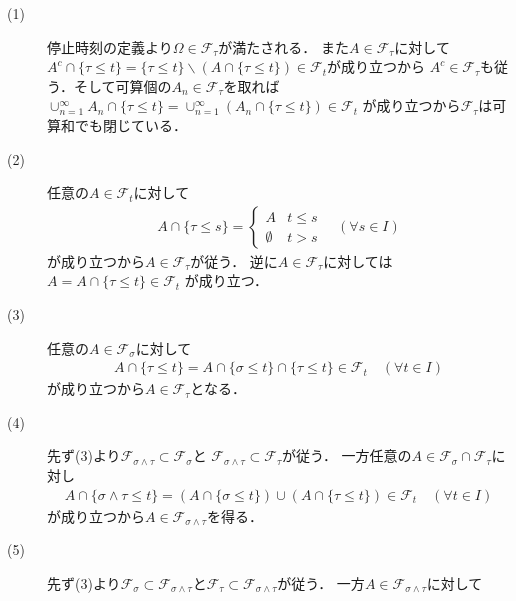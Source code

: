 	\begin{prf}\mbox{}
		\begin{description}
			\item[(1)] 停止時刻の定義より$\Omega \in \mathcal{F}_\tau$が満たされる．
				また$A \in \mathcal{F}_\tau$に対して
				$A^c \cap \{ \tau \leq t \} = \{ \tau \leq t \} \backslash \left( A \cap \{ \tau \leq t \} \right) \in \mathcal{F}_t$が成り立つから
				$A^c \in \mathcal{F}_\tau$も従う．そして可算個の$A_n \in \mathcal{F}_\tau$を取れば
				$\cup_{n=1}^{\infty} A_n \cap \{ \tau \leq t \} = \cup_{n=1}^{\infty} \left( A_n \cap \{ \tau \leq t \} \right) \in \mathcal{F}_t$
				が成り立つから$\mathcal{F}_{\tau}$は可算和でも閉じている．
			
			\item[(2)] 任意の$A \in \mathcal{F}_t$に対して
				\begin{align}
					A \cap \{ \tau \leq s \} =
					\begin{cases}
						A & t \leq s \\
						\emptyset & t > s
					\end{cases}
					\quad (\forall s \in I)
				\end{align}
				が成り立つから$A \in \mathcal{F}_\tau$が従う．
				逆に$A \in \mathcal{F}_\tau$に対しては$A = A \cap \{ \tau \leq t \} \in \mathcal{F}_t$
				が成り立つ．
				
			\item[(3)] 任意の$A \in \mathcal{F}_\sigma$に対して
				\begin{align}
					A \cap \{ \tau \leq t \} = A \cap \{ \sigma \leq t \} \cap \{ \tau \leq t \} \in \mathcal{F}_t 
					\quad (\forall t \in I)
				\end{align}
				が成り立つから$A \in \mathcal{F}_\tau$となる．
			
			\item[(4)] 先ず(3)より$\mathcal{F}_{\sigma \wedge \tau} \subset \mathcal{F}_\sigma$と
				$\mathcal{F}_{\sigma \wedge \tau} \subset \mathcal{F}_\tau$が従う．
				一方任意の$A \in \mathcal{F}_\sigma \cap \mathcal{F}_\tau$に対し
				\begin{align}
					A \cap \{ \sigma \wedge \tau \leq t \} 
					= \left( A \cap \{ \sigma \leq t \} \right) \cup \left( A \cap \{ \tau \leq t \} \right) \in \mathcal{F}_t \quad (\forall t \in I)
				\end{align}
				が成り立つから$A \in \mathcal{F}_{\sigma \wedge \tau}$を得る．
			
			\item[(5)] 
				先ず(3)より$\mathcal{F}_\sigma \subset \mathcal{F}_{\sigma \wedge \tau}$と$\mathcal{F}_\tau \subset \mathcal{F}_{\sigma \wedge \tau}$が従う．
				一方$A \in \mathcal{F}_{\sigma \wedge \tau}$に対して
				
		\end{description}
	\end{prf}
	
